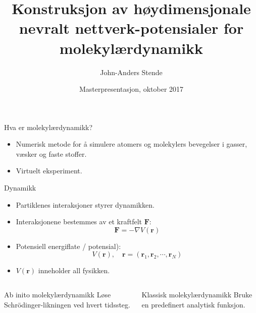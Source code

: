 \documentclass{beamer}
\title{Konstruksjon av høydimensjonale nevralt nettverk-potensialer for molekylærdynamikk}
\author{John-Anders Stende}
\institute{
  Fysisk institutt \\
  Universitetet i Oslo
}
\date{Masterpresentasjon, oktober 2017}
\begin{document}
\frame{\titlepage}


\begin{frame}

\begin{block}{Hva er molekylærdynamikk?}
  \begin{itemize}
  \item Numerisk metode for å simulere atomers og molekylers bevegelser i gasser, væsker og faste stoffer.
  \item Virtuelt eksperiment.
  \end{itemize}
\end{block}

\end{frame}


\begin{frame}

\begin{block}{Dynamikk}
  \begin{itemize}
  \item Partiklenes interaksjoner styrer dynamikken.
  \item Interaksjonene bestemmes av et kraftfelt $\mathbf{F}$:
    \begin{equation*}
    \mathbf{F} = -\nabla V(\mathbf{r})
    \end{equation*}
  \item Potensiell energiflate / potensial):
    \begin{equation*}
      V(\mathbf{r}), \quad \mathbf{r} = (\mathbf{r}_1, \mathbf{r}_2, \cdots, \mathbf{r}_N)
    \end{equation*}
  \item $V(\mathbf{r})$ inneholder all fysikken. 
  \end{itemize}
\end{block}

\end{frame}


\begin{frame}

\begin{columns}[T] %
  \begin{column}[T]{0.5\linewidth} %
    \begin{block}{Ab inito molekylærdynamikk}
    Løse Schrödinger-likningen ved hvert tidssteg.
    \end{block}
  \end{column}
  \begin{column}[T]{0.5\linewidth} %
    \begin{block}{Klassisk molekylærdynamikk}
    Bruke en predefinert analytisk funksjon.
    \end{block}
  \end{column}
\end{columns}

\end{frame}
\end{document}

